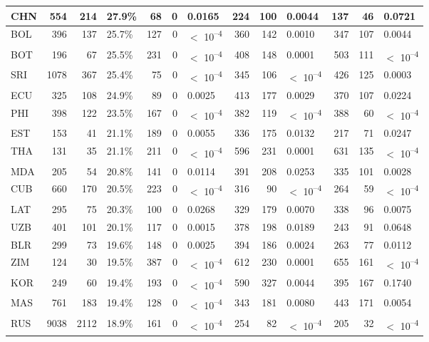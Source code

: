\begin{tabular}{l|r|r|l|r|r|l|r|r|l|r|r|l}
\hline
CHN & 554 & 214 & 27.9\% & 68 & 0 & 0.0165 & 224 & 100 & 0.0044 & 137 & 46 & 0.0721\\
\hline
BOL & 396 & 137 & 25.7\% & 127 & 0 & $<$ 10\textsuperscript{--4} & 360 & 142 & 0.0010 & 347 & 107 & 0.0044\\
\hline
BOT & 196 & 67 & 25.5\% & 231 & 0 & $<$ 10\textsuperscript{--4} & 408 & 148 & 0.0001 & 503 & 111 & $<$ 10\textsuperscript{--4}\\
\hline
SRI & 1078 & 367 & 25.4\% & 75 & 0 & $<$ 10\textsuperscript{--4} & 345 & 106 & $<$ 10\textsuperscript{--4} & 426 & 125 & 0.0003\\
\hline
ECU & 325 & 108 & 24.9\% & 89 & 0 & 0.0025 & 413 & 177 & 0.0029 & 370 & 107 & 0.0224\\
\hline
PHI & 398 & 122 & 23.5\% & 167 & 0 & $<$ 10\textsuperscript{--4} & 382 & 119 & $<$ 10\textsuperscript{--4} & 388 & 60 & $<$ 10\textsuperscript{--4}\\
\hline
EST & 153 & 41 & 21.1\% & 189 & 0 & 0.0055 & 336 & 175 & 0.0132 & 217 & 71 & 0.0247\\
\hline
THA & 131 & 35 & 21.1\% & 211 & 0 & $<$ 10\textsuperscript{--4} & 596 & 231 & 0.0001 & 631 & 135 & $<$ 10\textsuperscript{--4}\\
\hline
MDA & 205 & 54 & 20.8\% & 141 & 0 & 0.0114 & 391 & 208 & 0.0253 & 335 & 101 & 0.0028\\
\hline
CUB & 660 & 170 & 20.5\% & 223 & 0 & $<$ 10\textsuperscript{--4} & 316 & 90 & $<$ 10\textsuperscript{--4} & 264 & 59 & $<$ 10\textsuperscript{--4}\\
\hline
LAT & 295 & 75 & 20.3\% & 100 & 0 & 0.0268 & 329 & 179 & 0.0070 & 338 & 96 & 0.0075\\
\hline
UZB & 401 & 101 & 20.1\% & 117 & 0 & 0.0015 & 378 & 198 & 0.0189 & 243 & 91 & 0.0648\\
\hline
BLR & 299 & 73 & 19.6\% & 148 & 0 & 0.0025 & 394 & 186 & 0.0024 & 263 & 77 & 0.0112\\
\hline
ZIM & 124 & 30 & 19.5\% & 387 & 0 & $<$ 10\textsuperscript{--4} & 612 & 230 & 0.0001 & 655 & 161 & $<$ 10\textsuperscript{--4}\\
\hline
KOR & 249 & 60 & 19.4\% & 193 & 0 & $<$ 10\textsuperscript{--4} & 590 & 327 & 0.0044 & 395 & 167 & 0.1740\\
\hline
MAS & 761 & 183 & 19.4\% & 128 & 0 & $<$ 10\textsuperscript{--4} & 343 & 181 & 0.0080 & 443 & 171 & 0.0054\\
\hline
RUS & 9038 & 2112 & 18.9\% & 161 & 0 & $<$ 10\textsuperscript{--4} & 254 & 82 & $<$ 10\textsuperscript{--4} & 205 & 32 & $<$ 10\textsuperscript{--4}\\

\end{tabular}
